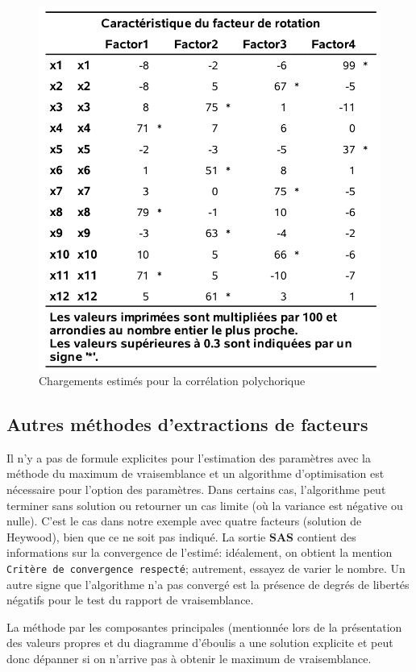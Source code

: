 \documentclass[
  11pt,
  letterpaper,
]{book}
\theoremstyle{definition}
\theoremstyle{definition}
\theoremstyle{definition}
\theoremstyle{definition}
\theoremstyle{remark}
\begin{document}
\begin{figure}

{\centering \includegraphics[width=0.65\linewidth]{figures/01-facto-e12} 

}

\caption{Chargements estimés pour la corrélation polychorique}\label{fig:fig1p12}
\end{figure}

\hypertarget{autres-muxe9thodes-dextractions-de-facteurs}{%
\subsection{Autres méthodes d'extractions de facteurs}\label{autres-muxe9thodes-dextractions-de-facteurs}}

Il n'y a pas de formule explicites pour l'estimation des paramètres avec la méthode du maximum de vraisemblance et un algorithme d'optimisation est nécessaire pour l'option des paramètres. Dans certains cas, l'algorithme peut terminer sans solution ou retourner un cas limite (où la variance est négative ou nulle). C'est le cas dans notre exemple avec quatre facteurs (solution de Heywood), bien que ce ne soit pas indiqué. La sortie \textbf{SAS} contient des informations sur la convergence de l'estimé: idéalement, on obtient la mention \texttt{Critère\ de\ convergence\ respecté}; autrement, essayez de varier le nombre. Un autre signe que l'algorithme n'a pas convergé est la présence de degrés de libertés négatifs pour le test du rapport de vraisemblance.

La méthode par les composantes principales (mentionnée lors de la présentation des valeurs propres et du diagramme d'éboulis a une solution explicite et peut donc dépanner si on n'arrive pas à obtenir le maximum de vraisemblance.
\end{document}
